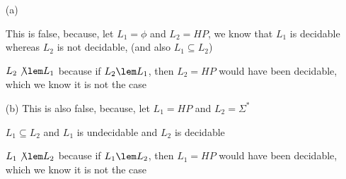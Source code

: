 \begin{enumerate}
    \item[(a)]
    
    This is false, because, let $L_1 = \phi$ and $L_2 = HP$, we know that $L_1$ is decidable whereas $L_2$ is not decidable, (and also $L_1 \subseteq L_2$)

    $L_2 \not \lem L_1$ because if $L_2 \lem L_1$, then $L_2 = HP$ would have been decidable, which we know it is not the case

    \item[(b)]
    This is also false, because, let $L_1 = HP$ and $L_2 = \Sigma^*$

    $L_1 \subseteq L_2$ and $L_1$ is undecidable and $L_2$ is decidable

    $L_1 \not \lem L_2$ because if $L_1 \lem L_2$, then $L_1 = HP$ would have been decidable, which we know it is not the case
\end{enumerate}









